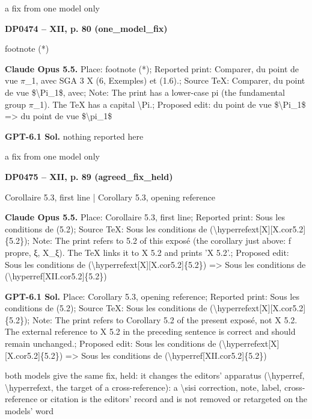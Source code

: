 a fix from one model only\par
\par\noindent\hypertarget{DP0474}{}\textbf{DP0474 -- XII, p. 80 (one\_model\_fix)}\par
footnote (*)\par
\textbf{Claude Opus 5.5.} Place: footnote (*); Reported print: Comparer, du point de vue \ensuremath{\pi}\_1, avec SGA 3 X (6, Exemples) et (1.6).; Source TeX: Comparer, du point de vue \$\textbackslash{}Pi\_1\$, avec; Note: The print has a lower-case pi (the fundamental group \ensuremath{\pi}\_1). The TeX has a capital \textbackslash{}Pi.; Proposed edit: du point de vue \$\textbackslash{}Pi\_1\$ =\allowbreak > du point de vue \$\textbackslash{}pi\_1\$\par
\textbf{GPT-6.1 Sol.} nothing reported here\par
a fix from one model only\par
\par\noindent\hypertarget{DP0475}{}\textbf{DP0475 -- XII, p. 89 (agreed\_fix\_held)}\par
Corollaire 5.3, first line | Corollary 5.3, opening reference\par
\textbf{Claude Opus 5.5.} Place: Corollaire 5.3, first line; Reported print: Sous les conditions de (5.2); Source TeX: Sous les conditions de (\textbackslash{}hyperrefext[X][X.cor5.2]\{5.2\}); Note: The print refers to 5.2 of this exposé (the corollary just above: f propre, ξ, X\_ξ). The TeX links it to X 5.2 and prints 'X 5.2'.; Proposed edit: Sous les conditions de (\textbackslash{}hyperrefext[X][X.cor5.2]\{5.2\}) =\allowbreak > Sous les conditions de (\textbackslash{}hyperref[XII.cor5.2]\{5.2\})\par
\textbf{GPT-6.1 Sol.} Place: Corollary 5.3, opening reference; Reported print: Sous les conditions de (5.2); Source TeX: Sous les conditions de (\textbackslash{}hyperrefext[X][X.cor5.2]\{5.2\}); Note: The print refers to Corollary 5.2 of the present exposé, not X 5.2. The external reference to X 5.2 in the preceding sentence is correct and should remain unchanged.; Proposed edit: Sous les conditions de (\textbackslash{}hyperrefext[X][X.cor5.2]\{5.2\}) =\allowbreak > Sous les conditions de (\textbackslash{}hyperref[XII.cor5.2]\{5.2\})\par
both models give the same fix, held: it changes the editors' apparatus (\textbackslash{}hyperref, \textbackslash{}hyperrefext, the target of a cross-reference): a \textbackslash{}sisi correction, note, label, cross-reference or citation is the editors' record and is not removed or retargeted on the models' word\par

